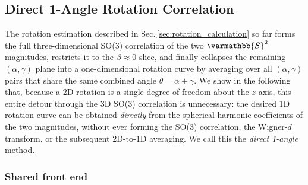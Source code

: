 %
%

\subsection{Direct 1-Angle Rotation Correlation}
\label{sec:direct_1angle}

The rotation estimation described in Sec.\,\ref{sec:rotation_calculation} so far
forms the full three-dimensional SO(3) correlation of the two $\varmathbb{S}^{2}$
magnitudes, restricts it to the $\beta\approx 0$ slice, and finally collapses the
remaining $(\alpha,\gamma)$ plane into a one-dimensional rotation curve by
averaging over all $(\alpha,\gamma)$ pairs that share the same combined angle
$\theta=\alpha+\gamma$. We show in the following that, because a 2D rotation is a
single degree of freedom about the $z$-axis, this entire detour through the 3D
SO(3) correlation is unnecessary: the desired 1D rotation curve can be obtained
\emph{directly} from the spherical-harmonic coefficients of the two magnitudes,
without ever forming the SO(3) correlation, the Wigner-$d$ transform, or the
subsequent 2D-to-1D averaging. We call this the \emph{direct 1-angle} method.

\subsubsection{Shared front end}
\label{sec:direct_frontend}

